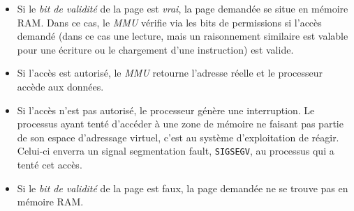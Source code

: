 \begin{itemize}
    \item Si le \textit{bit de validité} de la page est \textit{vrai},
        la page demandée se situe en mémoire RAM. Dans ce cas, le
        \textit{MMU} vérifie via les bits de permissions si l'accès
        demandé (dans ce cas une lecture, mais un raisonnement similaire
        est valable pour une écriture ou le chargement d'une
        instruction) est valide.
    \item Si l'accès est autorisé, le \textit{MMU} retourne l'adresse
        réelle et le processeur accède aux données.
    \item Si l'accès n'est pas autorisé, le processeur génère une
        interruption. Le processus ayant tenté d'accéder à une zone de
        mémoire ne faisant pas partie de son espace d'adressage virtuel,
        c'est au système d'exploitation de réagir. Celui-ci enverra un
        signal segmentation fault, \verb#SIGSEGV#, au processus qui a tenté cet accès.
    \item Si le \textit{bit de validité} de la page est faux, la page
        demandée ne se trouve pas en mémoire RAM.


\end{itemize}
